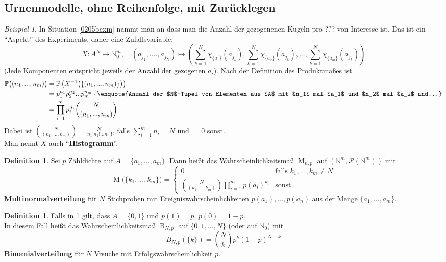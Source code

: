 \documentclass[10pt,a4paper]{article}
\newcommand{\N}{\ensuremath{\mathbb{N}}}
\newcommand{\potset}{\mathscr P}
\newcommand{\Prb}{\mathbb P}
\newcommand{\Mltn}{\operatorname{M}}
\newcommand{\Bin}{\operatorname{B}}
\theoremstyle{plain}
\theoremstyle{definition}
\newtheorem{definition}[theorem]{Definition}
\theoremstyle{remark}
\newtheorem{exm}[theorem]{Beispiel}
\begin{document}
	\subsection{Urnenmodelle, ohne Reihenfolge, mit Zurücklegen}
	\begin{exm}
		In Situation \ref{0205bexm} nammt man an dass man die Anzahl der gezogenenen Kugeln pro ??? von Interesse ist.
		Das ist ein \enquote{Aspekt} des Experiments, daher eine Zufallsvariable:
		\[X:A^N\mapsto \N_0^m,\quad (a_{j_1},....,a_{j_N})\mapsto\left(\sum_{k=1}^{N}\chi_{\{a_1\}}(a_{j_k}),\sum_{k=1}^{N}\chi_{\{a_2\}}(a_{j_k}),...,\sum_{k=1}^{N}\chi_{\{a_m\}}(a_{j_k})\right)\]
		(Jede Komponenten entspricht jeweils der Anzahl der gezogenen $a_i$). Nach der Definition des Produktmaßes ist
		\begin{align*}
		\Prb\big((n_1,...,n_m)\big)&=\Prb \left(X^{-1}\big(\{(n_1,...,n_m)\}\big)\right)\\
		&=p_1^{n_1}p_2^{n_2}...p_m^{n_m}\cdot\text{\enquote{Anzahl der $N$-Tupel von Elementen aus $A$ mit $n_1$ mal $a_1$ und $n_2$ mal $a_2$ und...}}\\
		&=\prod_{i=1}^{m}p_i^{n_i}\binom{N}{(n_1,...,n_m)}
		\end{align*}
		Dabei ist $\binom{N}{(n_1,...,n_m)}=\frac{N!}{n_1!n_2!...n_m!}$, falls $\sum_{i=1}^{m}n_i=N$ und $=0$ sonst.\\
		Man nennt $X$ auch \enquote{\textbf{Histogramm}}.
	\end{exm}
	\begin{definition}\label{0209adef}
		Sei $p$ Zähldichte auf $A=\{a_1,...,a_m\}$. Dann heißt das Wahrscheinlichkeitsmaß $\Mltn_{n,p}$ auf $(\N^m,\potset(\N^m))$ mit
		\[\Mltn\big(\{k_1,...,k_m\}\big)=\begin{cases}
		0&\text{falls $k_1,...,k_m\neq N$}\\
		\binom{N}{(k_1,...,k_m)}\prod_{i=1}^mp(a_i)^{k_i}&\text{sonst}
		\end{cases}\]
		\textbf{Multinormalverteilung} für $N$ Stichproben mit Ereigniswahrscheinlichkeiten $p(a_1),...,p(a_n)$ aus der Menge $\{a_1,...,a_m\}$.
	\end{definition}
	\addtocounter{theorem}{-1}
	\begin{definition}\label{0209bdef}
		Falls in \ref{0209adef} gilt, dass $A=\{0,1\}$ und $p(1)=p$, $p(0)=1-p$. \\
		In diesem Fall heißt das Wahrscheinlichkeitsmaß $\Bin_{N,p}$ auf $\{0,1,...,N\}$ (oder auf $\N_0$) mit
		\[B_{N,p}(\{k\})=\binom{N}{k}p^k(1-p)^{N-k}\]
		\textbf{Binomialverteilung} für $N$ Vrsuche mit Erfolgswahrscheinlichkeit $p$.
	\end{definition}
	
\end{document}
